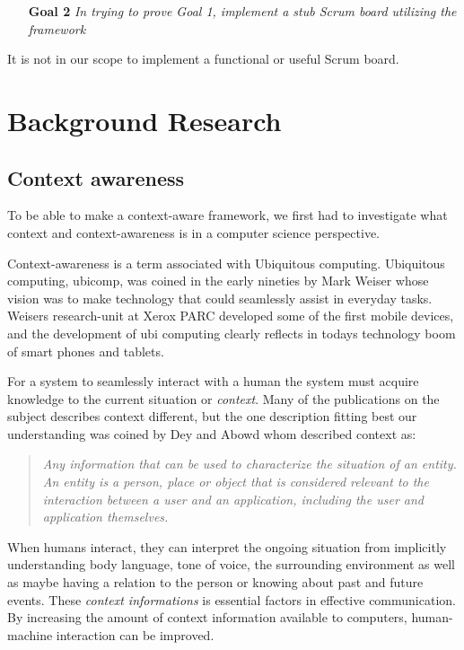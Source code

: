 \documentclass[]{report}
\begin{document}
\begin{itemize}
\item[\textbf{Goal 2 }] \textit{In trying to prove Goal 1, implement a stub Scrum board utilizing the framework}
\end{itemize}

It is not in our scope to implement a functional or useful Scrum board.

\chapter{Background Research}
\section{Context awareness}
To be able to make a context-aware framework, we first had to investigate what context and context-awareness is in a computer science perspective.

Context-awareness is a term associated with Ubiquitous computing. Ubiquitous computing, ubicomp, was coined in the early nineties by Mark Weiser whose vision was to make technology that could seamlessly assist in everyday tasks. Weisers research-unit at Xerox PARC developed some of the first mobile devices, and the development of ubi computing clearly reflects in todays technology boom of smart phones and tablets.

For a system to seamlessly interact with a human the system must acquire knowledge to the current situation or \textit{context}. Many of the publications on the subject describes context different, but the one description fitting best our understanding was coined by Dey and Abowd whom described context as:

\blockquote{\textit{Any information that can be used to characterize the situation of an entity. An entity is a person, place or object that is considered relevant to the interaction between a user and an application, including the user and application themselves.}} \cite{Dey and Abowd (2000)} 

When humans interact, they can interpret the ongoing situation from implicitly understanding body language, tone of voice, the surrounding environment as well as maybe having a relation to the person or knowing about past and future events. These \textit{context informations} is essential factors in effective communication. By increasing the amount of context information available to computers, human-machine interaction can be improved.\\
\end{document}
